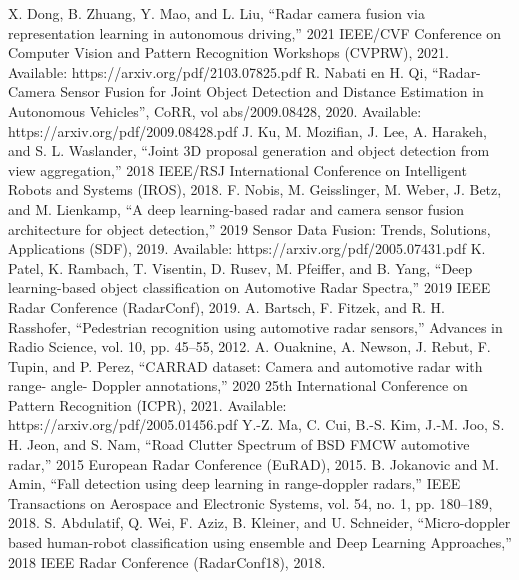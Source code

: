 \documentclass[11pt]{article}
\begin{document}
\begin{thebibliography}{9}
X. Dong, B. Zhuang, Y. Mao, and L. Liu, “Radar camera fusion via representation learning
in autonomous driving,” 2021 IEEE/CVF Conference on Computer Vision and Pattern
Recognition Workshops (CVPRW), 2021. Available: https://arxiv.org/pdf/2103.07825.pdf
R. Nabati en H. Qi, “Radar-Camera Sensor Fusion for Joint Object Detection and Distance
Estimation in Autonomous Vehicles”, CoRR, vol abs/2009.08428, 2020. Available:
https://arxiv.org/pdf/2009.08428.pdf
J. Ku, M. Mozifian, J. Lee, A. Harakeh, and S. L. Waslander, “Joint 3D proposal generation
and object detection from view aggregation,” 2018 IEEE/RSJ International Conference on
Intelligent Robots and Systems (IROS), 2018.
 F. Nobis, M. Geisslinger, M. Weber, J. Betz, and M. Lienkamp, “A deep learning-based
radar and camera sensor fusion architecture for object detection,” 2019 Sensor Data
Fusion: Trends, Solutions, Applications (SDF), 2019. Available:
https://arxiv.org/pdf/2005.07431.pdf
K. Patel, K. Rambach, T. Visentin, D. Rusev, M. Pfeiffer, and B. Yang, “Deep learning-based
object classification on Automotive Radar Spectra,” 2019 IEEE Radar Conference
(RadarConf), 2019.
A. Bartsch, F. Fitzek, and R. H. Rasshofer, “Pedestrian recognition using automotive radar
sensors,” Advances in Radio Science, vol. 10, pp. 45–55, 2012.
A. Ouaknine, A. Newson, J. Rebut, F. Tupin, and P. Perez, “CARRAD dataset: Camera and
automotive radar with range- angle- Doppler annotations,” 2020 25th International
Conference on Pattern Recognition (ICPR), 2021. Available:
https://arxiv.org/pdf/2005.01456.pdf
Y.-Z. Ma, C. Cui, B.-S. Kim, J.-M. Joo, S. H. Jeon, and S. Nam, “Road Clutter Spectrum of
BSD FMCW automotive radar,” 2015 European Radar Conference (EuRAD), 2015.
B. Jokanovic and M. Amin, “Fall detection using deep learning in range-doppler radars,”
IEEE Transactions on Aerospace and Electronic Systems, vol. 54, no. 1, pp. 180–189,
2018.
S. Abdulatif, Q. Wei, F. Aziz, B. Kleiner, and U. Schneider, “Micro-doppler based
human-robot classification using ensemble and Deep Learning Approaches,” 2018 IEEE
Radar Conference (RadarConf18), 2018.
\end{thebibliography}
\end{document}
